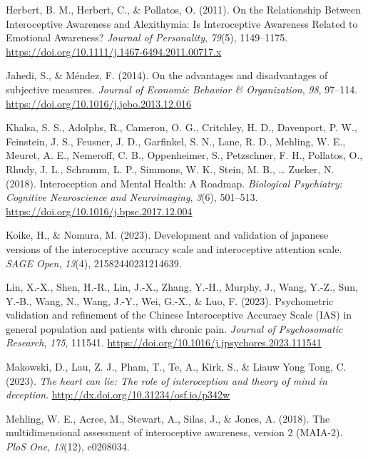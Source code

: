 \documentclass[
  man,
  floatsintext,
  longtable,
  nolmodern,
  notxfonts,
  notimes,
  colorlinks=true,linkcolor=blue,citecolor=blue,urlcolor=blue]{apa7}
\newlength{\cslhangindent}
\newenvironment{CSLReferences}[2] %
 {\begin{list}{}{%
  \setlength{\itemindent}{0pt}
  \setlength{\leftmargin}{0pt}
  \setlength{\parsep}{0pt}
  \ifodd #1
   \setlength{\leftmargin}{\cslhangindent}
   \setlength{\itemindent}{-1\cslhangindent}
  \fi
  \setlength{\itemsep}{#2\baselineskip}}}
 {\end{list}}
\begin{document}
\begin{CSLReferences}{1}{0}
Herbert, B. M., Herbert, C., \& Pollatos, O. (2011). On the Relationship
Between Interoceptive Awareness and Alexithymia: Is Interoceptive
Awareness Related to Emotional Awareness? \emph{Journal of Personality},
\emph{79}(5), 1149--1175.
\url{https://doi.org/10.1111/j.1467-6494.2011.00717.x}

Jahedi, S., \& Méndez, F. (2014). On the advantages and disadvantages of
subjective measures. \emph{Journal of Economic Behavior \&
Organization}, \emph{98}, 97--114.
\url{https://doi.org/10.1016/j.jebo.2013.12.016}

Khalsa, S. S., Adolphs, R., Cameron, O. G., Critchley, H. D., Davenport,
P. W., Feinstein, J. S., Feusner, J. D., Garfinkel, S. N., Lane, R. D.,
Mehling, W. E., Meuret, A. E., Nemeroff, C. B., Oppenheimer, S.,
Petzschner, F. H., Pollatos, O., Rhudy, J. L., Schramm, L. P., Simmons,
W. K., Stein, M. B., \ldots{} Zucker, N. (2018). Interoception and
Mental Health: A Roadmap. \emph{Biological Psychiatry: Cognitive
Neuroscience and Neuroimaging}, \emph{3}(6), 501--513.
\url{https://doi.org/10.1016/j.bpsc.2017.12.004}

Koike, H., \& Nomura, M. (2023). Development and validation of japanese
versions of the interoceptive accuracy scale and interoceptive attention
scale. \emph{SAGE Open}, \emph{13}(4), 21582440231214639.

Lin, X.-X., Shen, H.-R., Lin, J.-X., Zhang, Y.-H., Murphy, J., Wang,
Y.-Z., Sun, Y.-B., Wang, N., Wang, J.-Y., Wei, G.-X., \& Luo, F. (2023).
Psychometric validation and refinement of the Chinese Interoceptive
Accuracy Scale (IAS) in general population and patients with chronic
pain. \emph{Journal of Psychosomatic Research}, \emph{175}, 111541.
\url{https://doi.org/10.1016/j.jpsychores.2023.111541}

Makowski, D., Lau, Z. J., Pham, T., Te, A., Kirk, S., \& Liauw Yong
Tong, C. (2023). \emph{The heart can lie: The role of interoception and
theory of mind in deception}.
\url{http://dx.doi.org/10.31234/osf.io/p342w}

Mehling, W. E., Acree, M., Stewart, A., Silas, J., \& Jones, A. (2018).
The multidimensional assessment of interoceptive awareness, version 2
(MAIA-2). \emph{PloS One}, \emph{13}(12), e0208034.


\end{CSLReferences}
\end{document}
